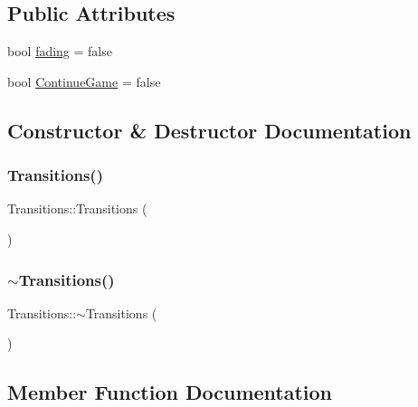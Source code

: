 \subsection*{Public Attributes}
\begin{DoxyCompactItemize}
\item 
bool \mbox{\hyperlink{class_transitions_a0b30954ba48edcc11d62e785ca203174}{fading}} = false
\item 
bool \mbox{\hyperlink{class_transitions_ac2fcd2927e84a6239a67ca292336fbc6}{Continue\+Game}} = false
\end{DoxyCompactItemize}


\subsection{Constructor \& Destructor Documentation}
\mbox{\label{class_transitions_af96d7b6a2b00135dddde4a8ad82da793}} 
\subsubsection{\texorpdfstring{Transitions()}{Transitions()}}
{\footnotesize\ttfamily Transitions\+::\+Transitions (\begin{DoxyParamCaption}{ }\end{DoxyParamCaption})}

\mbox{\label{class_transitions_a7fb3662acd43702a9483e07bf1e96eec}} 
\subsubsection{\texorpdfstring{$\sim$Transitions()}{~Transitions()}}
{\footnotesize\ttfamily Transitions\+::$\sim$\+Transitions (\begin{DoxyParamCaption}{ }\end{DoxyParamCaption})\hspace{0.3cm}{\ttfamily [virtual]}}



\subsection{Member Function Documentation}
\mbox{\label{class_transitions_a7280d32c9949be8e1211f945df187e15}} 
